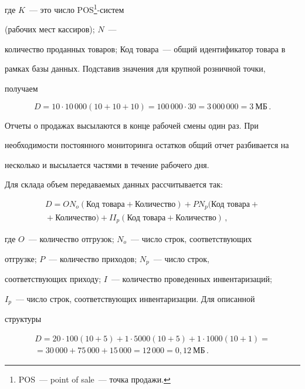 где $K$~--- это число POS\footnote{POS~--- point of sale~--- точка продажи.}-сис\-тем 


(рабочих мест кассиров); $N$~--- 


количество проданных товаров; Код товара~--- общий идентификатор товара в 


рамках базы данных. Подставив значения для крупной розничной точки, 


получаем


$$


    D = 10 \cdot 10\,000 (10 + 10 + 10) = 100\,000 \cdot 30 = 3\,000\,000 


= 3~\mbox{МБ}\,.


    $$


  


  Отчеты о продажах высылаются в конце рабочей смены один раз. При 


необходимости постоянного мониторинга остатков общий отчет разбивается на 


несколько и высылается частями в течение рабочего дня.


  


  Для склада объем передаваемых данных рассчитывается так:


\begin{multline*}


    D = O N_o  (\mbox{Код\ товара} + \mbox{Количество}) + P 


N_p  (\mbox{Код\ товара} +{}\\


{}+ \mbox{Количество}) + I  I_p 


(\mbox{Код\ товара} + \mbox{Количество})\,,


   \end{multline*}


где $O$~--- количество отгрузок; $N_o$~--- число строк, соответствующих 


отгрузке; $P$~--- количество приходов; $N_p$~--- число строк, 


соответствующих приходу; $I$~--- количество проведенных инвентаризаций; 


$I_p$~--- число строк, соответствующих инвентаризации. Для описанной 


структуры


\begin{multline*}


    D = 20 \cdot 100  (10 + 5) + 1 \cdot 5000  (10 + 5) + 1 \cdot 


1000 (10 + 1) = {}\\


{}=30\,000 + 75\,000 + 15\,000 = 12\,000 = 0{,}12~\mbox{МБ}\,.


   \end{multline*}


